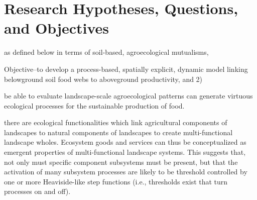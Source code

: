\section{Research Hypotheses, Questions, and Objectives}

as defined below in terms of soil-based, agroecological mutualisms,

Objective--to develop a process-based, spatially explicit, dynamic model linking belowground soil food webs to aboveground productivity, and 2) 

be able to evaluate landscape-scale agroecological patterns can generate virtuous ecological processes for the sustainable production of food. 


there are ecological functionalities which link agricultural components of landscapes to natural components of landscapes to create multi-functional landscape wholes. Ecosystem goods and services can thus be conceptualized as emergent properties of multi-functional landscape systems. This suggests that, not only must specific component subsystems must be present, but that the activation of many subsystem processes are likely to be threshold controlled by one or more Heaviside-like step functions (i.e., thresholds exist that turn processes on and off). 



